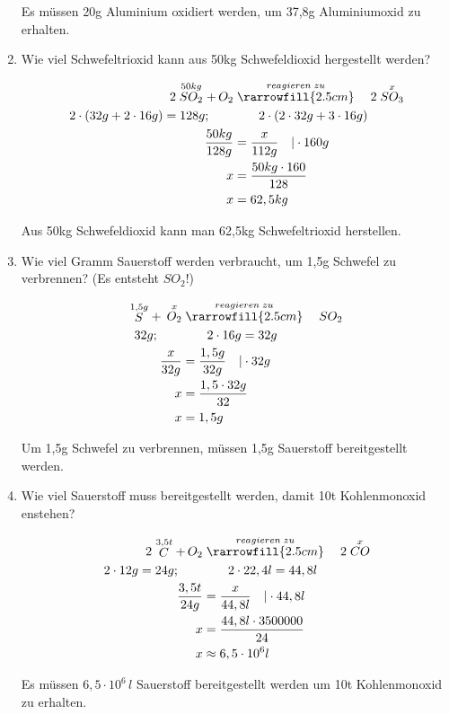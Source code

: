 \begin{enumerate}
Es müssen 20g Aluminium oxidiert werden, um 37,8g Aluminiumoxid zu erhalten.
\item Wie viel Schwefeltrioxid kann aus 50kg Schwefeldioxid hergestellt werden?

\begin{align}
2\stackrel{50kg}{SO_2} +\, {O_2}		&\stackrel{reagieren\;zu}{\rarrowfill{2.5cm}}\quad 2\stackrel{x}{SO_3} \\
2\cdot (32g+2\cdot 16g)=128g;	\qquad	&\qquad 2\cdot (2\cdot 32g+3\cdot 16g) \\
\frac{50kg}{128g}						&= \frac{x}{112g}\quad\vert \cdot 160g \\
x										&= \frac{50kg\cdot 160}{128} \\
x										&= 62,5kg
\end{align}

Aus 50kg Schwefeldioxid kann man 62,5kg Schwefeltrioxid herstellen.
\item Wie viel Gramm Sauerstoff werden verbraucht, um 1,5g Schwefel zu verbrennen? (Es entsteht $SO_2$!)

\begin{align}
\stackrel{1,5g}{S} +\, \stackrel{x}{O_2}		&\stackrel{reagieren\;zu}{\rarrowfill{2.5cm}}\quad {SO_2} \\
32g;									\qquad	&\qquad 2\cdot 16g=32g \\
\frac{x}{32g}									&= \frac{1,5g}{32g}\quad\vert \cdot 32g \\
x												&= \frac{1,5\cdot 32g}{32} \\
x												&= 1,5g
\end{align}

Um 1,5g Schwefel zu verbrennen, müssen 1,5g Sauerstoff bereitgestellt werden.
\item Wie viel Sauerstoff muss bereitgestellt werden, damit 10t Kohlenmonoxid enstehen?

\begin{align}
2\stackrel{3,5t}{C} +\, {O_2}	&\stackrel{reagieren\;zu}{\rarrowfill{2.5cm}}\quad 2\stackrel{x}{CO} \\
2\cdot 12g=24g;			\qquad	&\qquad 2\cdot 22,4l=44,8l \\
\frac{3,5t}{24g}				&= \frac{x}{44,8l}\quad\vert \cdot 44,8l \\
x								&= \frac{44,8l\cdot 3500000}{24} \\
x								&\approx 6,5\cdot 10^{6}l
\end{align}

Es müssen $6,5\cdot 10^{6}\,l$ Sauerstoff bereitgestellt werden um 10t Kohlenmonoxid zu erhalten.
\end{enumerate}

